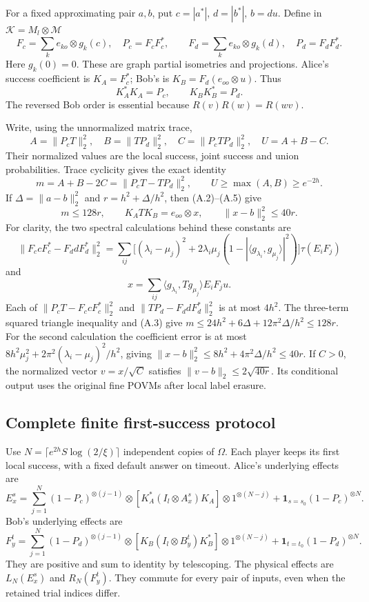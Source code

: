 \documentclass[11pt,reqno]{amsart}
\numberwithin{equation}{section}
\begin{document}
For a fixed approximating pair \(a,b\), put \(c=|a^*|\), \(d=|b^*|\), \(b=du\). Define in \(\mathcal K=M_l\otimes\mathcal M\) \[
 F_c=\sum_k e_{ko}\otimes g_k(c),\quad P_c=F_cF_c^*,\qquad
 F_d=\sum_k e_{ko}\otimes g_k(d),\quad P_d=F_dF_d^*.
\] Here \(g_k(0)=0\). These are graph partial isometries and projections. Alice's success coefficient is \(K_A=F_c^*\); Bob's is \(K_B=F_d(e_{oo}\otimes u)\). Thus \[
 K_A^*K_A=P_c,\qquad K_BK_B^*=P_d.
\] The reversed Bob order is essential because \(R(v)R(w)=R(wv)\).

Write, using the unnormalized matrix trace, \[
 A=\|P_cT\|_2^2,\quad B=\|TP_d\|_2^2,\quad
 C=\|P_cTP_d\|_2^2,\quad U=A+B-C.
\] Their normalized values are the local success, joint success and union probabilities. Trace cyclicity gives the exact identity \[
 m=A+B-2C=\|P_cT-TP_d\|_2^2,\qquad
 U\ge\max(A,B)\ge e^{-2h}. \tag{A.6}
\] If \(\Delta=\|a-b\|_2^2\) and \(r=h^2+\Delta/h^2\), then (A.2)--(A.5) give \[
 m\le128r,\qquad
 K_ATK_B=e_{oo}\otimes x,\qquad
 \|x-b\|_2^2\le40r. \tag{A.7}
\] For clarity, the two spectral calculations behind these constants are \[
 \|F_ccF_c^*-F_ddF_d^*\|_2^2
 =\sum_{ij}\bigl[(\lambda_i-\mu_j)^2+
 2\lambda_i\mu_j(1-|\langle g_{\lambda_i},g_{\mu_j}\rangle|^2)\bigr]
 \tau(E_iF_j)
\] and \[
 x=\sum_{ij}\langle g_{\lambda_i},Tg_{\mu_j}\rangle E_iF_ju.
\] Each of \(\|P_cT-F_ccF_c^*\|_2^2\) and \(\|TP_d-F_ddF_d^*\|_2^2\) is at most \(4h^2\). The three-term squared triangle inequality and (A.3) give \(m\le24h^2+6\Delta+12\pi^2\Delta/h^2\le128r\). For the second calculation the coefficient error is at most \(8h^2\mu_j^2+2\pi^2(\lambda_i-\mu_j)^2/h^2\), giving \(\|x-b\|_2^2\le8h^2+4\pi^2\Delta/h^2\le40r\). If \(C>0\), the normalized vector \(v=x/\sqrt C\) satisfies \(\|v-b\|_2\le2\sqrt{40r}\). Its conditional output uses the original fine POVMs after local label erasure.

\subsection{Complete finite first-success protocol}\label{complete-finite-first-success-protocol}

Use \(N=\lceil e^{2h}S\log(2/\xi)\rceil\) independent copies of \(\Omega\). Each player keeps its first local success, with a fixed default answer on timeout. Alice's underlying effects are \[
 E_x^s=\sum_{j=1}^N(1-P_c)^{\otimes(j-1)}
 \otimes[K_A^*(I_l\otimes A_x^s)K_A]\otimes1^{\otimes(N-j)}
 +\mathbf1_{s=s_0}(1-P_c)^{\otimes N}.
\] Bob's underlying effects are \[
 F_y^t=\sum_{j=1}^N(1-P_d)^{\otimes(j-1)}
 \otimes[K_B(I_l\otimes B_y^t)K_B^*]\otimes1^{\otimes(N-j)}
 +\mathbf1_{t=t_0}(1-P_d)^{\otimes N}.
\] They are positive and sum to identity by telescoping. The physical effects are \(L_N(E_x^s)\) and \(R_N(F_y^t)\). They commute for every pair of inputs, even when the retained trial indices differ.
\end{document}
